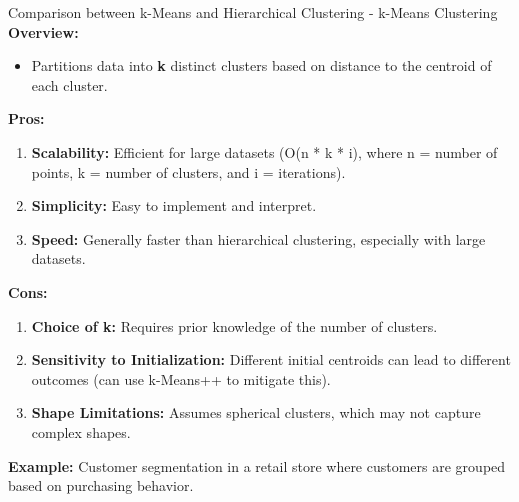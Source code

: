 \documentclass[aspectratio=169]{beamer}
\begin{document}
\begin{frame}[fragile]{Comparison between k-Means and Hierarchical Clustering - k-Means Clustering}
    \textbf{Overview:}
    \begin{itemize}
        \item Partitions data into \textbf{k} distinct clusters based on distance to the centroid of each cluster.
    \end{itemize}
    
    \textbf{Pros:}
    \begin{enumerate}
        \item \textbf{Scalability:} Efficient for large datasets (O(n * k * i), where n = number of points, k = number of clusters, and i = iterations).
        \item \textbf{Simplicity:} Easy to implement and interpret.
        \item \textbf{Speed:} Generally faster than hierarchical clustering, especially with large datasets.
    \end{enumerate}

    \textbf{Cons:}
    \begin{enumerate}
        \item \textbf{Choice of k:} Requires prior knowledge of the number of clusters.
        \item \textbf{Sensitivity to Initialization:} Different initial centroids can lead to different outcomes (can use k-Means++ to mitigate this).
        \item \textbf{Shape Limitations:} Assumes spherical clusters, which may not capture complex shapes.
    \end{enumerate}

    \textbf{Example:} Customer segmentation in a retail store where customers are grouped based on purchasing behavior.
\end{frame}
\end{document}
